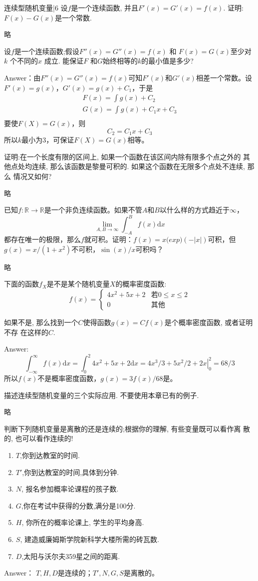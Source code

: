 \newChapter 连续型随机变量|6
\exer 设$f$是一个连续函数, 并且$F'(x) = G'(x) = f(x)$. 证明:$F(x) - G(x)$是一个常数.\par
略

\exer 设$f$是一个连续函数;假设$F''(x) = G''(x) = f(x)$ 和 $F(x) = G(x)$至少对 $k$ 个不同的$x$ 成立. 能保证$F$ 和$G$始终相等的$k$的最小值是多少?\par
Answer：由$F''(x) = G''(x) = f(x)$可知$F'(x)$和$G'(x)$相差一个常数。设$F'(x)=g(x)$，$G'(x)=g(x)+C_1$，于是
\begin{gather*}
F(x)=\int g(x) + C_2 \\
G(x)=\int g(x) + C_1x + C_3 \\
\end{gather*}
要使$F(X)=G(x)$，则
\[C_2 = C_1x + C_3\]
所以$k$最小为3，可保证$F(X)=G(x)$相等。

\exer 证明:在一个长度有限的区间上, 如果一个函数在该区间内除有限多个点之外的 其他点处均连续, 那么该函数是黎曼可积的. 如果这个函数在无限多个点处不连续, 那么 情况又如何?\par
略

\exer 已知$f:\mathbb{R}\to\mathbb{R}$是一个非负连续函数。如果不管$A$和$B$以什么样的方式趋近于$\infty$，
\[\lim_{A,B\to\infty}\int_{-A}^Bf(x)\mathrm dx\]
都存在唯一的极限，那么$f$就可积。证明：$f(x)=x\mathrm(exp)(-|x|)$可积，但$g(x)=x/(1+x^2)$不可积，$\sin(x)/x$可积吗？\par
略

\exer 下面的函数$f_X$是不是某个随机变量$X$的概率密度函数:
\[f(x)=\begin{cases}
4x^2+5x+2 & \text{若}0\le x\le 2 \\
0 & \text{其他}
\end{cases}\]\par
如果不是, 那么找到一个$C$使得函数$g(x) = Cf(x)$是个概率密度函数, 或者证明不存
在这样的$C$.\par
Answer:
\[\int_{-\infty}^\infty f(x)\mathrm dx = \int_0^2 4x^2+5x+2\mathrm dx =\left. 4x^3/3 + 5x^2/2 + 2x \right|_0^2=68/3\]
所以$f(x)$不是概率密度函数，$g(x)=3f(x)/68$是。

\exer 描述连续型随机变量的三个实际应用. 不要使用本章已有的例子.\par
略

\exer 判断下列随机变量是离散的还是连续的;根据你的理解, 有些变量既可以看作离
散的, 也可以看作连续的!
\begin{enumerate}
\item $T$,你到达教室的时间. 
\item $T'$,你到达教室的时间,具体到分钟.
\item $N$, 报名参加概率论课程的孩子数. 
\item $G$,你在考试中获得的分数,满分是100分.
\item $H$, 你所在的概率论课上, 学生的平均身高.
\item $S$, 建造威廉姆斯学院新科学大楼所需的砖瓦数. 
\item $D$,太阳与沃尔夫359星之间的距离.
\end{enumerate}
Answer： $T,H,D$是连续的；$T',N,G,S$是离散的。

